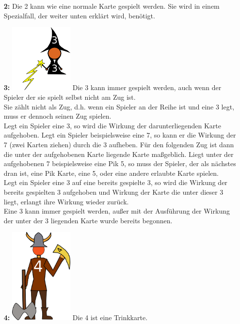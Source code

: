 \documentclass{article}
\begin{document}
       
\begin{itemize}
\item[\textbf{2:}]
Die 2 kann wie eine normale Karte gespielt werden. Sie wird in einem Spezialfall, der weiter unten erklärt wird, benötigt.
\item[\textbf{3:}]
\includegraphics[width=0.25\textwidth]{photos/wizard.png}
Die 3 kann immer gespielt werden, auch wenn der Spieler der sie spielt selbst nicht am Zug ist. \\ Sie zählt nicht als Zug, d.h. wenn ein Spieler an der Reihe ist und eine 3 legt, muss er dennoch seinen Zug spielen. \\
Legt ein Spieler eine 3, so wird die Wirkung der darunterliegenden Karte aufgehoben. Legt ein Spieler beispielsweise eine 7, so kann er die Wirkung der 7 (zwei Karten ziehen) durch die 3 aufheben. Für den folgenden Zug ist dann die
unter der aufgehobenen Karte liegende Karte maßgeblich. Liegt unter der aufgehobenen 7 beispielsweise eine Pik 5, so muss der Spieler, der als nächstes dran ist, eine Pik Karte, eine 5, oder eine andere erlaubte Karte spielen. \\
Legt ein Spieler eine 3 auf eine bereits gespielte 3, so wird die Wirkung der bereits gespielten 3 aufgehoben und Wirkung der Karte die unter dieser 3 liegt, erlangt ihre Wirkung wieder zurück. \\ Eine 3 kann immer gespielt werden, außer mit der Ausführung der Wirkung der unter der 3 liegenden Karte wurde bereits begonnen.
\item[\textbf{4:}]
\includegraphics[width=0.25\textwidth]{photos/viking.png}
                 Die 4 ist eine Trinkkarte. \\

\end{itemize}
\end{document}

